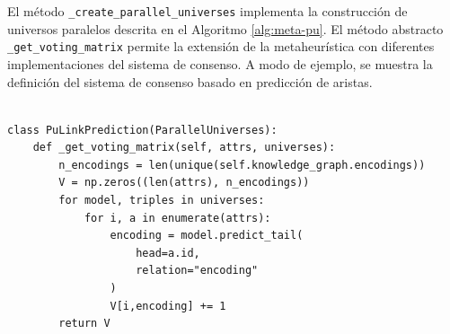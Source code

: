 

El m\'etodo \texttt{\_create\_parallel\_universes} implementa
la construcci\'on de universos paralelos descrita en el Algoritmo \ref{alg:meta-pu}. El
m\'etodo abstracto \texttt{\_get\_voting\_matrix} permite
la extensi\'on de la metaheur\'istica con diferentes implementaciones del sistema
de consenso.
A modo de ejemplo, se muestra la definici\'on del sistema de consenso basado en predicci\'on de aristas.


\begin{lstlisting}[caption= Modelo de universos paralelos basado en predicci\'on de aristas, label = code:pl-pu]

class PuLinkPrediction(ParallelUniverses):
    def _get_voting_matrix(self, attrs, universes):
        n_encodings = len(unique(self.knowledge_graph.encodings))
        V = np.zeros((len(attrs), n_encodings))
        for model, triples in universes:
            for i, a in enumerate(attrs):
                encoding = model.predict_tail(
                    head=a.id,
                    relation="encoding"
                )
                V[i,encoding] += 1
        return V

\end{lstlisting}





